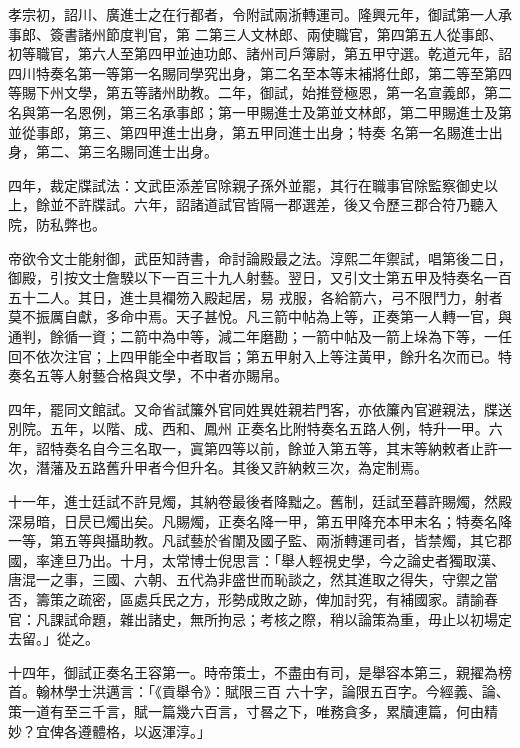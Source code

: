 \begin{pinyinscope}
 孝宗初，詔川、廣進士之在行都者，令附試兩浙轉運司。隆興元年，御試第一人承事郎、簽書諸州節度判官，第
 二第三人文林郎、兩使職官，第四第五人從事郎、初等職官，第六人至第四甲並迪功郎、諸州司戶簿尉，第五甲守選。乾道元年，詔四川特奏名第一等第一名賜同學究出身，第二名至本等末補將仕郎，第二等至第四等賜下州文學，第五等諸州助教。二年，御試，始推登極恩，第一名宣義郎，第二名與第一名恩例，第三名承事郎；第一甲賜進士及第並文林郎，第二甲賜進士及第並從事郎，第三、第四甲進士出身，第五甲同進士出身；特奏
 名第一名賜進士出身，第二、第三名賜同進士出身。



 四年，裁定牒試法：文武臣添差官除親子孫外並罷，其行在職事官除監察御史以上，餘並不許牒試。六年，詔諸道試官皆隔一郡選差，後又令歷三郡合符乃聽入院，防私弊也。



 帝欲令文士能射御，武臣知詩書，命討論殿最之法。淳熙二年禦試，唱第後二日，御殿，引按文士詹騤以下一百三十九人射藝。翌日，又引文士第五甲及特奏名一百五十二人。其日，進士具襴笏入殿起居，易
 戎服，各給箭六，弓不限鬥力，射者莫不振厲自獻，多命中焉。天子甚悅。凡三箭中帖為上等，正奏第一人轉一官，與通判，餘循一資；二箭中為中等，減二年磨勘；一箭中帖及一箭上垛為下等，一任回不依次注官；上四甲能全中者取旨；第五甲射入上等注黃甲，餘升名次而已。特奏名五等人射藝合格與文學，不中者亦賜帛。



 四年，罷同文館試。又命省試簾外官同姓異姓親若門客，亦依簾內官避親法，牒送別院。五年，以階、成、西和、鳳州
 正奏名比附特奏名五路人例，特升一甲。六年，詔特奏名自今三名取一，寘第四等以前，餘並入第五等，其末等納敕者止許一次，潛藩及五路舊升甲者今但升名。其後又許納敕三次，為定制焉。



 十一年，進士廷試不許見燭，其納卷最後者降黜之。舊制，廷試至暮許賜燭，然殿深易暗，日昃已燭出矣。凡賜燭，正奏名降一甲，第五甲降充本甲末名；特奏名降一等，第五等與攝助教。凡試藝於省闈及國子監、兩浙轉運司者，皆禁燭，其它郡
 國，率達旦乃出。十月，太常博士倪思言：「舉人輕視史學，今之論史者獨取漢、唐混一之事，三國、六朝、五代為非盛世而恥談之，然其進取之得失，守禦之當否，籌策之疏密，區處兵民之方，形勢成敗之跡，俾加討究，有補國家。請諭春官：凡課試命題，雜出諸史，無所拘忌；考核之際，稍以論策為重，毋止以初場定去留。」從之。



 十四年，御試正奏名王容第一。時帝策士，不盡由有司，是舉容本第三，親擢為榜首。翰林學士洪邁言：「《貢舉令》：賦限三百
 六十字，論限五百字。今經義、論、策一道有至三千言，賦一篇幾六百言，寸晷之下，唯務貪多，累牘連篇，何由精妙？宜俾各遵體格，以返渾淳。」




\end{pinyinscope}
